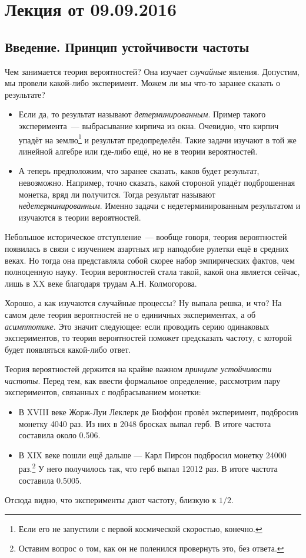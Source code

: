 \section{Лекция от 09.09.2016}
\subsection{Введение. Принцип устойчивости частоты}
Чем занимается теория вероятностей? Она изучает \emph{случайные} явления. Допустим, мы провели какой-либо эксперимент. Можем ли мы что-то заранее сказать о результате?
\begin{itemize}
    \item Если да, то результат называют \emph{детерминированным}. Пример такого эксперимента~--- выбрасывание кирпича из окна. Очевидно, что кирпич упадёт на землю\footnote{Если его не запустили с первой космической скоростью, конечно.} и результат предопределён. Такие задачи изучают в той же линейной алгебре или где-либо ещё, но не в теории вероятностей.
    \item А теперь предположим, что заранее сказать, каков будет результат, невозможно. Например, точно сказать, какой стороной упадёт подброшенная монетка, вряд ли получится. Тогда результат называют \emph{недетерминированным}. Именно задачи с недетерминированным результатом и изучаются в теории вероятностей.
\end{itemize}
Небольшое историческое отступление~--- вообще говоря, теория вероятностей появилась в связи с изучением азартных игр наподобие рулетки ещё в средних веках. Но тогда она представляла собой скорее набор эмпирических фактов, чем полноценную науку. Теория вероятностей стала такой, какой она является сейчас, лишь в XX веке благодаря трудам А.Н. Колмогорова.

Хорошо, а как изучаются случайные процессы? Ну выпала решка, и что? На самом деле теория вероятностей не о единичных экспериментах, а об \emph{асимптотике}. Это значит следующее: если проводить серию одинаковых экспериментов, то теория вероятностей поможет предсказать частоту, с которой будет появляться какой-либо ответ.

Теория вероятностей держится на крайне важном \emph{принципе устойчивости частоты}. Перед тем, как ввести формальное определение, рассмотрим пару экспериментов, связанных с подбрасыванием монетки:
\begin{itemize}
    \item В XVIII веке Жорж-Луи Леклерк де Бюффон провёл эксперимент, подбросив монетку 4040 раз. Из них в 2048 бросках выпал герб. В итоге частота составила около 0.506.
    \item В XIX веке пошли ещё дальше --- Карл Пирсон подбросил монетку 24000 раз.\footnote{Оставим вопрос о том, как он не поленился провернуть это, без ответа.} У него получилось так, что герб выпал 12012 раз. В итоге частота составила 0.5005.
\end{itemize}
Отсюда видно, что эксперименты дают частоту, близкую к \(1/2\).


